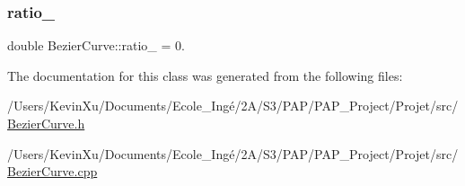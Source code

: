 \mbox{\label{class_bezier_curve_a9a6d08efdae6b77334cb731f6c593142}} 
\subsubsection{\texorpdfstring{ratio\+\_\+}{ratio\_}}
{\footnotesize\ttfamily double Bezier\+Curve\+::ratio\+\_\+ = 0.\hspace{0.3cm}{\ttfamily [private]}}



The documentation for this class was generated from the following files\+:\begin{DoxyCompactItemize}
\item 
/\+Users/\+Kevin\+Xu/\+Documents/\+Ecole\+\_\+\+Ingé/2\+A/\+S3/\+P\+A\+P/\+P\+A\+P\+\_\+\+Project/\+Projet/src/\mbox{\hyperlink{_bezier_curve_8h}{Bezier\+Curve.\+h}}\item 
/\+Users/\+Kevin\+Xu/\+Documents/\+Ecole\+\_\+\+Ingé/2\+A/\+S3/\+P\+A\+P/\+P\+A\+P\+\_\+\+Project/\+Projet/src/\mbox{\hyperlink{_bezier_curve_8cpp}{Bezier\+Curve.\+cpp}}\end{DoxyCompactItemize}

